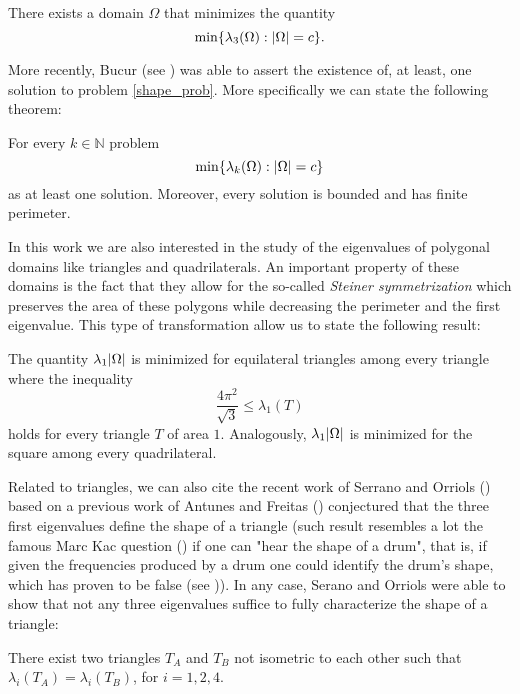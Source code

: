 \begin{theorem}
    There exists a domain \(\Omega\) that minimizes the quantity
    \[
    \min\{\lambda_3(\Omega): \abs{\Omega} = c\}.
    \]
\end{theorem}

More recently, Bucur (see \cite{bucur2012minimization}) was able to assert the existence of, at least, one solution to problem \eqref{shape_prob}. More specifically we can state the following theorem:
\begin{theorem}[Bucur]
    For every \(k \in \mathbb{N}\) problem
    \[
    \min\{\lambda_k(\Omega): \abs{\Omega} = c\}
    \]
    as at least one solution. Moreover, every solution is bounded and has finite perimeter.
\end{theorem}

In this work we are also interested in the study of the eigenvalues of polygonal domains like triangles and quadrilaterals. An important property of these domains is the fact that they allow for the so-called \textit{Steiner symmetrization} which preserves the area of these polygons while decreasing the perimeter and the first eigenvalue. This type of transformation allow us to state the following result:
\begin{theorem}
    The quantity \(\lambda_1 \abs{\Omega}\) is minimized for equilateral triangles among every triangle where the inequality
    \[
    \frac{4 \pi^2}{\sqrt{3}} \leq  \lambda_1(T)
    \]
    holds for every triangle \(T\) of area \(1\).
    Analogously, \(\lambda_1 \abs{\Omega}\) is minimized for the square among every quadrilateral.
\end{theorem}

Related to triangles, we can also cite the recent work of Serrano and Orriols (\cite{gomez2021any}) based on a previous work of Antunes and Freitas (\cite{antunes2011inverse}) conjectured that the three first eigenvalues define the shape of a triangle (such result resembles a lot the famous Marc Kac question (\cite{kac1966can}) if one can "hear the shape of a drum", that is, if given the frequencies produced by a drum one could identify the drum's shape, which has proven to be false (see \cite{gordon1992isospectral})). In any case, Serano and Orriols were able to show that not any three eigenvalues suffice to fully characterize the shape of a triangle:
\begin{theorem}
    There exist two triangles \(T_A\) and \(T_B\) not isometric to each other such that \(\lambda_i(T_A) = \lambda_i(T_B)\), for \(i=1, 2, 4\).    
\end{theorem}

